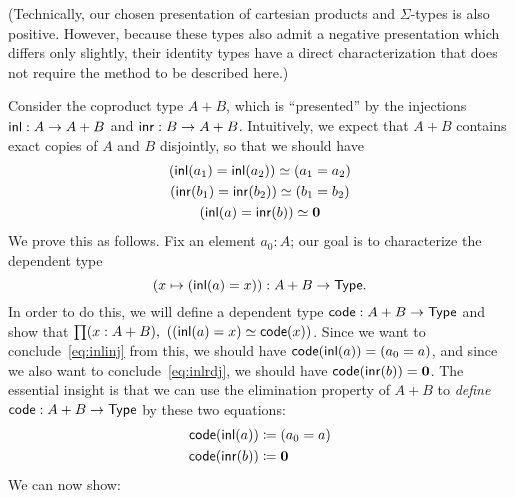 (Technically, our chosen presentation of cartesian products and $\Sigma$-types is also positive.
However, because these types also admit a negative presentation which differs only slightly, their identity types have a direct characterization that does not require the method to be described here.)

Consider the coproduct type $A+B$, which is ``presented'' by the injections $\mathsf{inl}:A\to A+B$ and $\mathsf{inr}:B\to A+B$.
Intuitively, we expect that $A+B$ contains exact copies of $A$ and $B$ disjointly, so that we should have
\begin{gather}
  (\mathsf{inl}(a_1)=\mathsf{inl}(a_2)) \simeq (a_1=a_2) \label{eq:inlinj}\\
  (\mathsf{inr}(b_1)=\mathsf{inr}(b_2)) \simeq (b_1=b_2)\\
  (\mathsf{inl}(a)= \mathsf{inr}(b)) \simeq \mathbf{0} \label{eq:inlrdj}
\end{gather}
We prove this as follows.
Fix an element $a_0:A$; our goal is to characterize the dependent type
\[(x\mapsto (\mathsf{inl}(a)=x)) : A+B \to \mathsf{Type}.\]
In order to do this, we will define a dependent type $\mathsf{code}:A+B\to\mathsf{Type}$ and show that $\prd{x:A+B} (\eqv{(\inl(a)=x)}{\code(x)})$.
Since we want to conclude~\eqref{eq:inlinj} from this, we should have $\mathsf{code}(\mathsf{inl}(a)) = (a_0=a)$, and since we also want to conclude~\eqref{eq:inlrdj}, we should have $\mathsf{code} (\mathsf{inr}(b)) = \mathbf{0}$.
The essential insight is that we can use the elimination property of $A+B$ to \emph{define} $\mathsf{code}:A+B\to\mathsf{Type}$ by these two equations:
\begin{align*}
  \mathsf{code}(\mathsf{inl}(a)) &\coloneqq (a_0=a)\\
  \mathsf{code}(\mathsf{inr}(b)) &\coloneqq \mathbf{0}
\end{align*}
We can now show:

